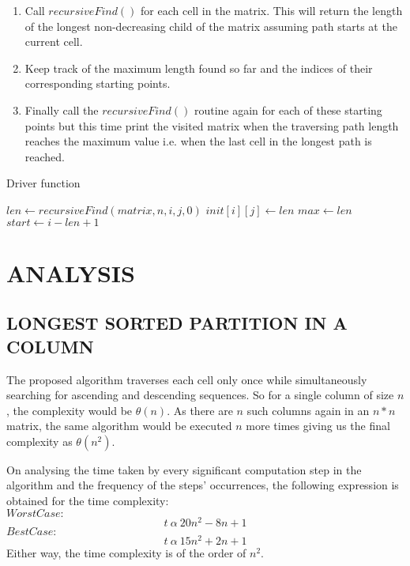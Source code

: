 \documentclass[letterpaper, 11 pt, conference]{ieeeconf}  %
\begin{document}
\begin{enumerate}
\item Call $recursiveFind()$ for each cell in the matrix. This will return the length of the longest non-decreasing child of the matrix assuming path starts at the current cell.
\item Keep track of the maximum length found so far and the indices of their corresponding starting points.
\item Finally call the $recursiveFind()$ routine again for each of these starting points but this time print the visited matrix when the traversing path length reaches the maximum value i.e. when the last cell in the longest path is reached.
\end{enumerate}

\begin{algorithm}
\caption{Driver function}\label{alg:driver}
\begin{algorithmic}
\small
{}
        \State $len\gets recursiveFind(matrix, n, i, j, 0)$    
        \State $init[i][j]\gets len$
            \State $max\gets len$
            \State $start\gets i - len + 1$
        \EndIf
	\EndFor
\EndFor
\end{algorithmic}
\end{algorithm}

\section{ANALYSIS}
\subsection{LONGEST SORTED PARTITION IN A COLUMN}
The proposed algorithm traverses each cell only once while simultaneously searching for ascending and descending sequences. So for a single column of size $n$, the complexity would be $\theta(n)$. As there are $n$ such columns again in an $n*n$ matrix, the same algorithm would be executed $n$ more times giving us the final complexity as $\theta(n^2)$.

On analysing the time taken by every significant computation step in the algorithm and the frequency of the steps’ occurrences, the following expression is obtained for the time complexity: \\ 
$ Worst Case:$
\[t\ \alpha\ 20n^2-8n+1 \]
$ Best Case:$
\[t\ \alpha\ 15n^2+2n+1\]
Either way, the time complexity is of the order of $n^2$.
\end{document}

